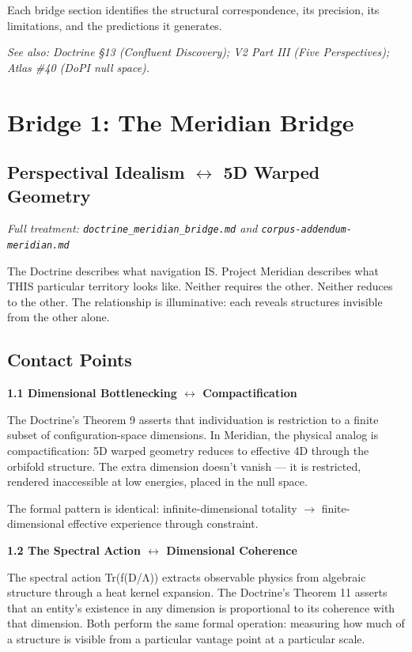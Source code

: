 Each bridge section identifies the structural correspondence, its precision, its limitations, and the predictions it generates.


\textit{See also: Doctrine §13 (Confluent Discovery); V2 Part III (Five Perspectives); Atlas \#40 (DoPI null space).}


\bigskip\noindent\makebox[\textwidth]{\color{rulegray}\rule{5cm}{0.3pt}}\bigskip


\section*{Bridge 1: The Meridian Bridge}


\subsection*{Perspectival Idealism $\leftrightarrow$ 5D Warped Geometry}


\textit{Full treatment: \texttt{doctrine\_meridian\_bridge.md} and \texttt{corpus-addendum-meridian.md}}


The Doctrine describes what navigation IS. Project Meridian describes what THIS particular territory looks like. Neither requires the other. Neither reduces to the other. The relationship is illuminative: each reveals structures invisible from the other alone.


\subsection*{Contact Points}


\textbf{1.1 Dimensional Bottlenecking $\leftrightarrow$ Compactification}


The Doctrine's Theorem 9 asserts that individuation is restriction to a finite subset of configuration-space dimensions. In Meridian, the physical analog is compactification: 5D warped geometry reduces to effective 4D through the orbifold structure. The extra dimension doesn't vanish — it is restricted, rendered inaccessible at low energies, placed in the null space.


The formal pattern is identical: infinite-dimensional totality $\rightarrow$ finite-dimensional effective experience through constraint.


\textbf{1.2 The Spectral Action $\leftrightarrow$ Dimensional Coherence}


The spectral action Tr(f(D/Λ)) extracts observable physics from algebraic structure through a heat kernel expansion. The Doctrine's Theorem 11 asserts that an entity's existence in any dimension is proportional to its coherence with that dimension. Both perform the same formal operation: measuring how much of a structure is visible from a particular vantage point at a particular scale.


